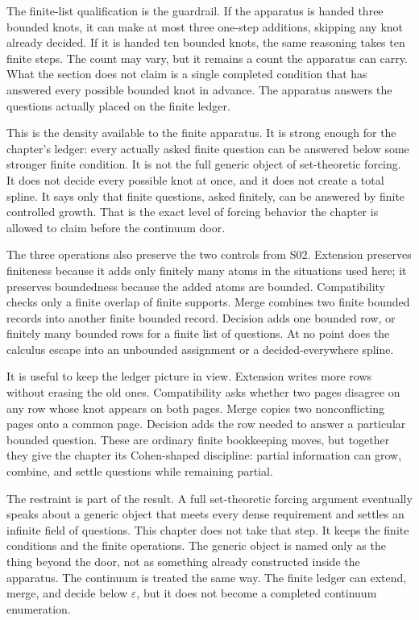 The finite-list qualification is the guardrail. If the apparatus is handed
three bounded knots, it can make at most three one-step additions, skipping any
knot already decided. If it is handed ten bounded knots, the same reasoning
takes ten finite steps. The count may vary, but it remains a count the
apparatus can carry. What the section does not claim is a single completed
condition that has answered every possible bounded knot in advance. The
apparatus answers the questions actually placed on the finite ledger.

This is the density available to the finite apparatus. It is strong enough for
the chapter's ledger: every actually asked finite question can be answered
below some stronger finite condition. It is not the full generic object of
set-theoretic forcing. It does not decide every possible knot at once, and it
does not create a total spline. It says only that finite questions, asked
finitely, can be answered by finite controlled growth. That is the exact level
of forcing behavior the chapter is allowed to claim before the continuum door.

The three operations also preserve the two controls from S02. Extension
preserves finiteness because it adds only finitely many atoms in the situations
used here; it preserves boundedness because the added atoms are bounded.
Compatibility checks only a finite overlap of finite supports. Merge combines
two finite bounded records into another finite bounded record. Decision adds
one bounded row, or finitely many bounded rows for a finite list of questions.
At no point does the calculus escape into an unbounded assignment or a
decided-everywhere spline.

It is useful to keep the ledger picture in view. Extension writes more rows
without erasing the old ones. Compatibility asks whether two pages disagree on
any row whose knot appears on both pages. Merge copies two nonconflicting pages
onto a common page. Decision adds the row needed to answer a particular bounded
question. These are ordinary finite bookkeeping moves, but together they give
the chapter its Cohen-shaped discipline: partial information can grow, combine,
and settle questions while remaining partial.

The restraint is part of the result. A full set-theoretic forcing argument
eventually speaks about a generic object that meets every dense requirement and
settles an infinite field of questions. This chapter does not take that step.
It keeps the finite conditions and the finite operations. The generic object is
named only as the thing beyond the door, not as something already constructed
inside the apparatus. The continuum is treated the same way. The finite ledger
can extend, merge, and decide below \(\varepsilon\), but it does not become a
completed continuum enumeration.

